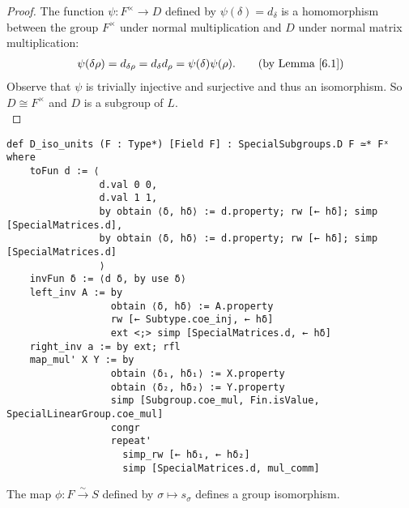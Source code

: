 \begin{proof}
    \leanok
    The function $\psi: F^\times \rightarrow D$ defined by $\psi(\delta) = d_\delta$ is a homomorphism between the group $F^\times$ under normal multiplication and $D$ under normal matrix multiplication:
\begin{align*} \psi(\delta \rho) = d_{\delta \rho} =  d_\delta d_\rho = \psi(\delta) \psi(\rho). \tag{by Lemma \ref{6.1}}
\end{align*}
Observe that $\psi$ is trivially injective and surjective and thus an isomorphism. So $D\cong F^\times$ and $D$ is a subgroup of $L$.\\
\end{proof}
\begin{footnotesize}
\begin{verbatim}
def D_iso_units (F : Type*) [Field F] : SpecialSubgroups.D F ≃* Fˣ where
    toFun d := ⟨
                d.val 0 0,
                d.val 1 1,
                by obtain ⟨δ, hδ⟩ := d.property; rw [← hδ]; simp [SpecialMatrices.d],
                by obtain ⟨δ, hδ⟩ := d.property; rw [← hδ]; simp [SpecialMatrices.d]
                ⟩
    invFun δ := ⟨d δ, by use δ⟩
    left_inv A := by
                  obtain ⟨δ, hδ⟩ := A.property
                  rw [← Subtype.coe_inj, ← hδ]
                  ext <;> simp [SpecialMatrices.d, ← hδ]
    right_inv a := by ext; rfl
    map_mul' X Y := by
                  obtain ⟨δ₁, hδ₁⟩ := X.property
                  obtain ⟨δ₂, hδ₂⟩ := Y.property
                  simp [Subgroup.coe_mul, Fin.isValue, SpecialLinearGroup.coe_mul]
                  congr
                  repeat'
                    simp_rw [← hδ₁, ← hδ₂]
                    simp [SpecialMatrices.d, mul_comm]
\end{verbatim}
\end{footnotesize}



\begin{definition}
\label{SpecialSubgroups.S_iso_F}
\leanok
    The map $\phi : F \overset{\sim}{\rightarrow} S$ defined by $\sigma \mapsto s_\sigma$ defines a group isomorphism.
\end{definition}

